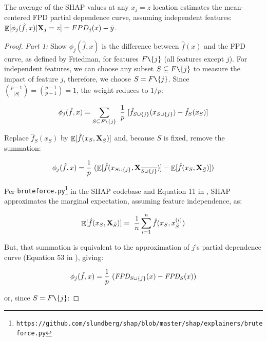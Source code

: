 \documentclass[11pt]{article}
\newcommand{\todo}[1]{{{\small\color{red}{[#1]}}}}
\DeclareMathOperator{\Ex}{\mathbb{E}}
\begin{document}
\begin{theorem}
The average of the SHAP values at any $x_j=z$ location estimates the mean-centered FPD partial dependence curve, assuming independent features: $\Ex[ \phi_j(\hat{f},x) | {\bf X}_j = z] = FPD_j(x) - \bar{y}$.
\end{theorem}

\begin{proof}
{\em Part 1: } Show $\phi_j(\hat{f},x)$ is the difference between $\hat{f}(x)$ and the FPD curve, as defined by Friedman, for features $F \texttt{\char`\\} \{j\}$ (all features except $j$). For independent features, we can choose any subset $S \subseteq F \texttt{\char`\\} \{j\}$ to measure the impact of feature $j$, therefore, we choose $S = F \texttt{\char`\\} \{j\}$. Since ${{p-1}\choose{|S|}} = {{p-1}\choose{p-1}} = 1$, the weight reduces to $1/p$:

\[
\phi_j(\hat{f},x) = \sum_{S \subseteq F \texttt{\char`\\} \{j\}}\
\frac{1}{p}\
 [ \hat{f}_{S \cup \{j\}}(x_{S \cup \{j\}}) - \hat{f}_S(x_S) ]
\]

\noindent Replace $\hat{f}_S(x_{S})$ by $\Ex[\hat{f}(x_{S},{\bf X}_{\bar{S}})]$ and, because $S$ is fixed, remove the summation:

\[
\phi_j(\hat{f},x) = \frac{1}{p}\
 ( \Ex[\hat{f}(x_{S \cup \{j\}},{\bf X}_{\overline{S \cup \{j\}}})] - \Ex[\hat{f}(x_{S},{\bf X}_{\bar{S}})] )
\]

\todo{ah ha! 1/p goes away because it is counting the number of permutations but we are only using one}

\noindent Per {\tt\small bruteforce.py}\footnote{\tt https://github.com/slundberg/shap/blob/master/shap/explainers/bruteforce.py} in the SHAP codebase and Equation 11 in \cite{shap}, SHAP approximates the marginal expectation, assuming feature independence, as:

\[
\Ex[\hat{f}(x_{S},{\bf X}_{\bar{S}})] = \
    \frac{1}{n} \sum_{i=1}^n \hat{f}(x_S, x_{\bar{S}}^{(i)})
\]

\noindent But, that summation is equivalent to the approximation of $j$'s partial dependence curve (Equation 53 in \citealt{PDP}), giving:

\[
\phi_j(\hat{f},x) = \frac{1}{p}\
(  \text{\it FPD}_{S \cup \{j\}}(x) - \text{\it FPD}_{S}(x) )
\]

\noindent or, since $S = F \texttt{\char`\\} \{j\}$:


\end{proof}
\end{document}
